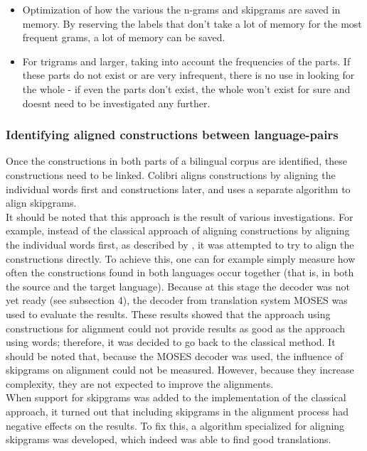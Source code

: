 \documentclass[12pt]{article}
\begin{document}
\begin{itemize}
\item Optimization of how the various the n-grams and skipgrams are saved in memory. By reserving the labels that don't take a lot of memory for the most frequent grams, a lot of memory can be saved.
\item For trigrams and larger, taking into account the frequencies of the parts. If these parts do not exist or are very infrequent, there is no use in looking for the whole - if even the parts don't exist, the whole won't exist for sure and doesnt need to be investigated any further.
\end{itemize}

\subsubsection{Identifying aligned constructions between language-pairs}
Once the constructions in both parts of a bilingual corpus are identified, these constructions need to be linked. Colibri aligns constructions by aligning the individual words first and constructions later, and uses a separate algorithm to align skipgrams.\\\indent
It should be noted that this approach is the result of various investigations. For example, instead of the classical approach of aligning constructions by aligning the individual words first, as described by \citep{koehn03}, it was attempted to try to align the constructions directly. To achieve this, one can for example simply measure how often the constructions found in both languages occur together (that is, in both the source and the target language). Because at this stage the decoder was not yet ready (see subsection 4), the decoder from translation system MOSES \citep{koehnea07} was used to evaluate the results. These results showed that the approach using constructions for alignment could not provide results as good as the approach using words; therefore, it was decided to go back to the classical method. It should be noted that, because the MOSES decoder was used, the influence of skipgrams on alignment could not be measured. However, because they increase complexity, they are not expected to improve the alignments.\\\indent
When support for skipgrams was added to the implementation of the classical approach, it turned out that including skipgrams in the alignment process had negative effects on the results. To fix this, a algorithm specialized for aligning skipgrams was developed, which indeed was able to find good translations. 
\end{document}
